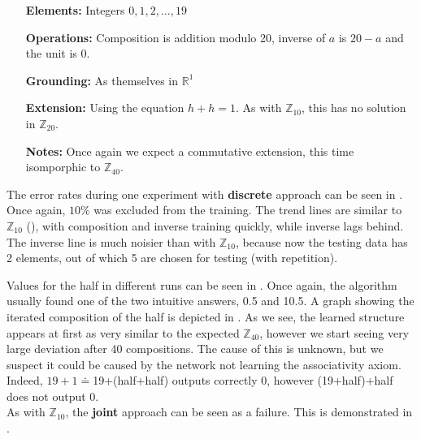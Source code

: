 \begin{itemize}
	\item[\textbf{Elements:}] Integers $0,1,2,\dots,19$
	\item[\textbf{Operations:}] Composition is addition modulo 20, inverse of $a$ is $20-a$ and the unit is 0.
	\item[\textbf{Grounding:}] As themselves in $\mathbb{R}^1$
	\item[\textbf{Extension:}] Using the equation $h+h=1$. As with $\mathbb{Z}_{10}$, this has no solution in $\mathbb{Z}_{20}$.
	\item[\textbf{Notes:}] Once again we expect a commutative extension, this time isomporphic to $\mathbb{Z}_{40}$.
\end{itemize}

The error rates during one experiment with \textbf{discrete} approach can be seen in . Once again, $10\%$ was excluded from the training. The trend lines are similar to $\mathbb{Z}_{10}$ (), with composition and inverse training quickly, while inverse lags behind. The inverse line is much noisier than with $\mathbb{Z}_{10}$, because now the testing data has 2 elements, out of which 5 are chosen for testing (with repetition).

Values for the half in different runs can be seen in . Once again, the algorithm usually found one of the two intuitive answers, 0.5 and 10.5. A graph showing the iterated composition of the half is depicted in . As we see, the learned structure appears at first as very similar to the expected $\mathbb{Z}_{40}$, however we start seeing very large deviation after 40 compositions. The cause of this is unknown, but we suspect it could be caused by the network not learning the associativity axiom. Indeed, $19+1\doteq$19+(half+half) outputs correctly $0$, however (19+half)+half does not output 0.\\


As with $\mathbb{Z}_{10}$, the \textbf{joint} approach can be seen as a failure. This is demonstrated in .

